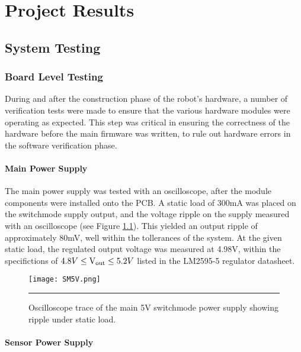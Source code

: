 \chapter{Project Results}
\label{chp:results}


\section{System Testing}

\FloatBarrier
\subsection{Board Level Testing}

During and after the construction phase of the robot's hardware, a number of verification tests were made to ensure that the various hardware modules were operating as expected. This step was critical in ensuring the correctness of the hardware before the main firmware was written, to rule out hardware errors in the software verification phase.

\FloatBarrier
\subsubsection{Main Power Supply}

The main power supply was tested with an oscilloscope, after the module components were installed onto the PCB. A static load of 300mA was placed on the switchmode supply output, and the voltage ripple on the supply measured with an oscilloscope (see Figure \ref{fig:mainpowerripple}). This yielded an output ripple of approximately 80mV, well within the tollerances of the system. At the given static load, the regulated output voltage was measured at 4.98V, within the specifictions of \(4.8V\leq\text{V\ensuremath{_{\textrm{out}}}}\leq5.2V\) listed in the LM2595-5 regulator datasheet.

\begin{figure}[tbph]
	\vspace{1em}
	\centering
		\texttt{[image: SM5V.png]}
	\rule{35em}{0.5pt}
	\caption[Switch-mode 5V Power Supply Oscilloscope Trace]{Oscilloscope trace of the main 5V switchmode power supply showing ripple under static load.}
	\label{fig:mainpowerripple}
\end{figure}

\FloatBarrier
\subsubsection{Sensor Power Supply}

